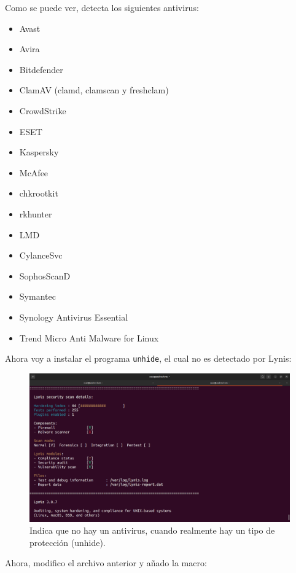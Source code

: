 \documentclass{article}
\begin{document}
Como se puede ver, detecta los siguientes antivirus: 

\begin{itemize}
    \item Avast
    \item Avira
    \item Bitdefender
    \item ClamAV (clamd, clamscan y freshclam)
    \item CrowdStrike
    \item ESET
    \item Kaspersky
    \item McAfee
    \item chkrootkit
    \item rkhunter
    \item LMD
    \item CylanceSvc
    \item SophosScanD
    \item Symantec
    \item Synology Antivirus Essential
    \item Trend Micro Anti Malware for Linux
\end{itemize}

Ahora voy a instalar el programa \verb|unhide|, el cual no es detectado por Lynis:

\begin{figure}[H]
    \includegraphics[width=\textwidth]{imagenes/lynisresults3unhide.png}
    \caption{Indica que no hay un antivirus, cuando realmente hay un tipo de protección (unhide).}
\end{figure}

Ahora, modifico el archivo anterior y añado la macro:
\end{document}
